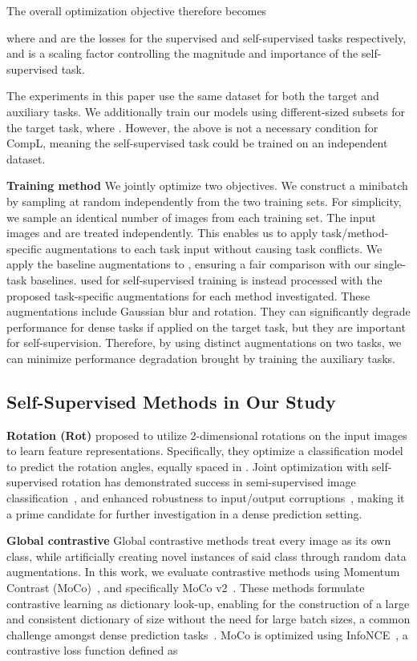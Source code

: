 \documentclass[10pt,twocolumn,letterpaper]{article}
\newcommand{\parsection}[1]{\vspace{1mm}\noindent\textbf{#1 }}
\begin{document}
The overall optimization objective therefore becomes


\noindent where  and  are the losses for the supervised and self-supervised tasks respectively, and  is a scaling factor controlling the magnitude and importance of the self-supervised task.

The experiments in this paper use the same dataset for both the target and auxiliary tasks. 
We additionally train our models using different-sized subsets  for the target task, where .
However, the above is not a necessary condition for CompL, meaning the self-supervised task could be trained on an independent dataset.

\parsection{Training method}
We jointly optimize two objectives. 
We construct a minibatch by sampling at random independently from the two training sets. 
For simplicity, we sample an identical number of images from each training set. 
The input images  and  are treated independently.
This enables us to apply task/method-specific augmentations to each task input without causing task conflicts. We apply the baseline augmentations to , ensuring a fair comparison with our single-task baselines. 
 used for self-supervised training is instead processed with the proposed task-specific augmentations for each method investigated.
These augmentations include Gaussian blur and rotation. 
They can significantly degrade performance for dense tasks if applied on the target task, but they are important for self-supervision.
Therefore, by using distinct augmentations on two tasks, we can minimize performance degradation brought by training the auxiliary tasks.

\subsection{Self-Supervised Methods in Our Study}
\label{ss_methods}

\parsection{Rotation (Rot)} 
\cite{gidaris2018unsupervised} proposed to utilize 2-dimensional rotations on the input images to learn feature representations. 
Specifically, they optimize a classification model to predict the rotation angles, equally spaced in . 
Joint optimization with self-supervised rotation has demonstrated success in semi-supervised image classification~\cite{gidaris2019boosting,zhai2019s4l}, and enhanced robustness to input/output corruptions~\cite{hendrycks2019using}, making it a prime candidate for further investigation in a dense prediction setting.

\parsection{Global contrastive}
Global contrastive methods treat every image as its own class, while artificially creating novel instances of said class through random data augmentations. 
In this work, we evaluate contrastive methods using Momentum Contrast (MoCo)~\cite{he2020momentum}, and specifically MoCo v2~\cite{chen2020improved}. 
These methods formulate contrastive learning as dictionary look-up, enabling for the construction of a large and consistent dictionary of size  without the need for large batch sizes, a common challenge amongst dense prediction tasks~\cite{chen2018encoder}. 
MoCo is optimized using InfoNCE~\cite{oord2018representation}, a contrastive loss function defined as
\vspace{-0.05in}
\end{document}
